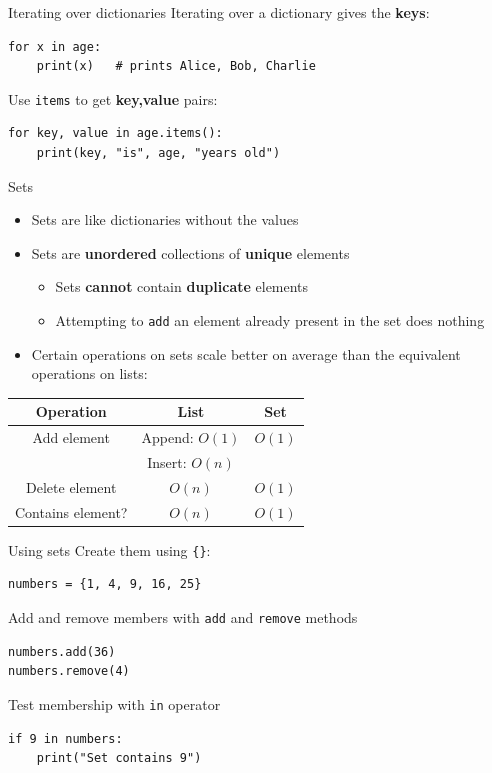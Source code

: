 \begin{frame}[fragile]{Iterating over dictionaries}
	\pause Iterating over a dictionary gives the \textbf{keys}:
	\begin{lstlisting}
for x in age:
    print(x)   # prints Alice, Bob, Charlie
	\end{lstlisting}
	\pause Use \lstinline{items} to get \textbf{key,value} pairs:
	\begin{lstlisting}
for key, value in age.items():
    print(key, "is", age, "years old")
	\end{lstlisting}
\end{frame}

\begin{frame}{Sets}
	\begin{itemize}
		\pause\item Sets are like dictionaries without the values
		\pause\item Sets are \textbf{unordered} collections of \textbf{unique} elements
            \begin{itemize}
                \pause\item Sets \textbf{cannot} contain \textbf{duplicate} elements
                \pause\item Attempting to \lstinline{add} an element already present in the set does nothing
            \end{itemize}
		\pause\item Certain operations on sets scale better on average than the equivalent operations on lists:
	\end{itemize}
	\pause
	\begin{center}
		\begin{tabular}{|c|c|c|}
			\hline
			\textbf{Operation} & \textbf{List} & \textbf{Set} \\\hline
			Add element & Append: $O(1)$ & $O(1)$ \\
			& Insert: $O(n)$ & \\\hline
			Delete element & $O(n)$ & $O(1)$ \\\hline
			Contains element? & $O(n)$ & $O(1)$ \\\hline
		\end{tabular}
	\end{center}
\end{frame}

\begin{frame}[fragile]{Using sets}
    \pause Create them using \lstinline|{}|:
	\begin{lstlisting}
numbers = {1, 4, 9, 16, 25}
	\end{lstlisting}
	\pause Add and remove members with \lstinline{add} and \lstinline{remove} methods
	\begin{lstlisting}
numbers.add(36)
numbers.remove(4)
	\end{lstlisting}
	\pause Test membership with \lstinline{in} operator
	\begin{lstlisting}
if 9 in numbers:
    print("Set contains 9")
	\end{lstlisting}
\end{frame}

